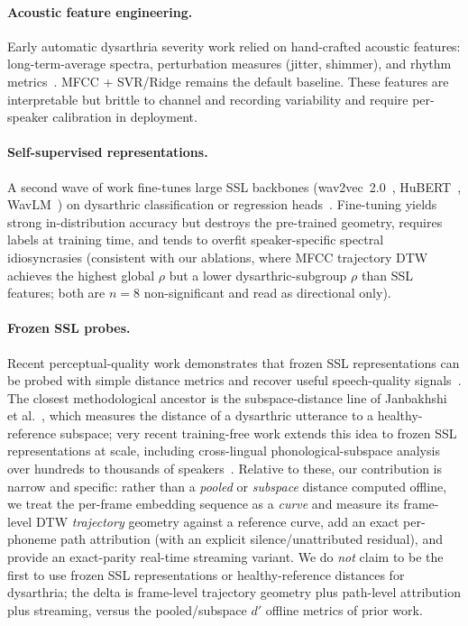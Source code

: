 
\paragraph{Acoustic feature engineering.} Early automatic dysarthria
severity work relied on hand-crafted acoustic features: long-term-average
spectra, perturbation measures (jitter, shimmer), and rhythm
metrics~\cite{Tu2017XVectorDysarthria,Berisha2014AcousticMarkers}. MFCC
+ SVR/Ridge remains the default baseline. These features are
interpretable but brittle to channel and recording variability and require
per-speaker calibration in deployment.

\paragraph{Self-supervised representations.} A second wave of work
fine-tunes large SSL backbones (wav2vec~2.0~\cite{Baevski2020wav2vec2},
HuBERT~\cite{Hsu2021HuBERT}, WavLM~\cite{Chen2022WavLM}) on dysarthric
classification or regression
heads~\cite{Hernandez2020SSLDysarthria,Joshi2021IndianDysarthria,Schu2023SSLDys}.
Fine-tuning yields strong in-distribution accuracy but destroys the
pre-trained geometry, requires labels at training time, and tends to
overfit speaker-specific spectral idiosyncrasies (consistent with our
ablations, where MFCC trajectory DTW achieves the highest global $\rho$
but a lower dysarthric-subgroup $\rho$ than SSL features; both are $n = 8$
non-significant and read as directional only).

\paragraph{Frozen SSL probes.} Recent perceptual-quality work demonstrates
that frozen SSL representations can be probed with simple distance metrics
and recover useful speech-quality
signals~\cite{Millet2022SSLPerceptual,Janbakhshi2021PCADys}. The closest
methodological ancestor is the subspace-distance line of Janbakhshi et
al.~\cite{Janbakhshi2019Subspace,Janbakhshi2021PCADys}, which measures the
distance of a dysarthric utterance to a healthy-reference subspace; very
recent training-free work extends this idea to frozen SSL representations
at scale, including cross-lingual phonological-subspace analysis over
hundreds to thousands of
speakers~\cite{Muller2026TrainingFree,Subspace2026Collapse}. Relative to
these, our contribution is narrow and specific: rather than a
\emph{pooled} or \emph{subspace} distance computed offline, we treat the
per-frame embedding sequence as a \emph{curve} and measure its frame-level
DTW \emph{trajectory} geometry against a reference curve, add an exact
per-phoneme path attribution (with an explicit silence/unattributed
residual), and provide an exact-parity real-time streaming variant. We do
\emph{not} claim to be the first to use frozen SSL representations or
healthy-reference distances for dysarthria; the delta is frame-level
trajectory geometry plus path-level attribution plus streaming, versus the
pooled/subspace $d'$ offline metrics of prior work.

